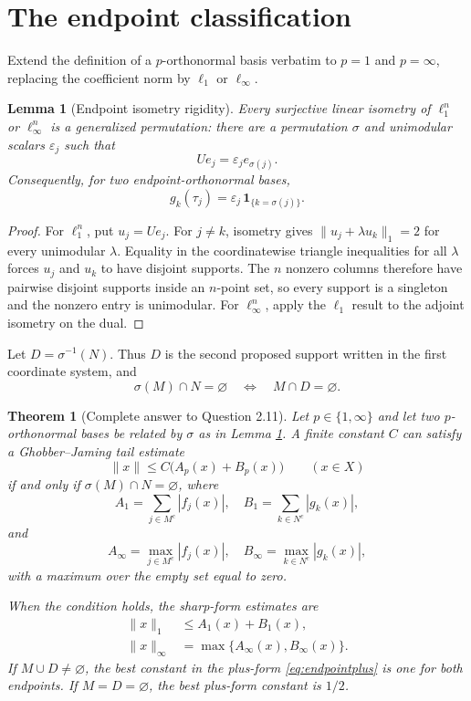 \documentclass[11pt]{article}
\newtheorem{theorem}{Theorem}
\newtheorem{lemma}{Lemma}
\begin{document}
\section{The endpoint classification}

Extend the definition of a $p$-orthonormal basis verbatim to $p=1$ and
$p=\infty$, replacing the coefficient norm by $\ell_1$ or $\ell_\infty$.

\begin{lemma}[Endpoint isometry rigidity]\label{lem:rigidity}
Every surjective linear isometry of $\ell_1^n$ or $\ell_\infty^n$ is a
generalized permutation: there are a permutation $\sigma$ and unimodular
scalars $\varepsilon_j$ such that
\[
 Ue_j=\varepsilon_j e_{\sigma(j)}.
\]
Consequently, for two endpoint-orthonormal bases,
\[
 g_k(\tau_j)=\varepsilon_j\,\mathbf 1_{\{k=\sigma(j)\}}.
\]
\end{lemma}

\begin{proof}
For $\ell_1^n$, put $u_j=Ue_j$.  For $j\ne k$, isometry gives
$\|u_j+\lambda u_k\|_1=2$ for every unimodular $\lambda$.  Equality in the
coordinatewise triangle inequalities for all $\lambda$ forces $u_j$ and
$u_k$ to have disjoint supports.  The $n$ nonzero columns therefore have
pairwise disjoint supports inside an $n$-point set, so every support is a
singleton and the nonzero entry is unimodular.  For $\ell_\infty^n$, apply
the $\ell_1$ result to the adjoint isometry on the dual.
\end{proof}

Let $D=\sigma^{-1}(N)$.  Thus $D$ is the second proposed support written in
the first coordinate system, and
\[
 \sigma(M)\cap N=\varnothing\quad\Longleftrightarrow\quad M\cap D=\varnothing.
\]

\begin{theorem}[Complete answer to Question 2.11]\label{thm:endpoint}
Let $p\in\{1,\infty\}$ and let two $p$-orthonormal bases be related by
$\sigma$ as in Lemma \ref{lem:rigidity}.  A finite constant $C$ can satisfy a
Ghobber--Jaming tail estimate
\begin{equation}\label{eq:endpointplus}
 \|x\|\le C\bigl(A_p(x)+B_p(x)\bigr)\qquad(x\in X)
\end{equation}
if and only if $\sigma(M)\cap N=\varnothing$, where
\[
 A_1=\sum_{j\in M^c}|f_j(x)|,
 \quad B_1=\sum_{k\in N^c}|g_k(x)|,
\]
and
\[
 A_\infty=\max_{j\in M^c}|f_j(x)|,
 \quad B_\infty=\max_{k\in N^c}|g_k(x)|,
\]
with a maximum over the empty set equal to zero.

When the condition holds, the sharp-form estimates are
\begin{align}
 \|x\|_1&\le A_1(x)+B_1(x),\label{eq:l1}\\
 \|x\|_\infty&=\max\{A_\infty(x),B_\infty(x)\}.
 \label{eq:linfty}
\end{align}
If $M\cup D\ne\varnothing$, the best constant in the plus-form
\eqref{eq:endpointplus} is one for both endpoints.  If $M=D=\varnothing$,
the best plus-form constant is $1/2$.
\end{theorem}
\end{document}
